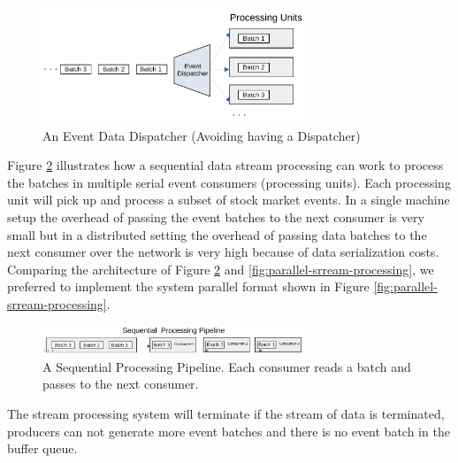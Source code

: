 \begin{figure}[]
    \begin{center}
        \includegraphics[width=0.7\textwidth]{./images/Stream-Batch-Distributions}
        \caption{An Event Data Dispatcher (Avoiding having a Dispatcher)}
        \label{fig:batch-distributions}
    \end{center}
\end{figure}

Figure \ref{fig:Sequential-batch-distributions} illustrates how a sequential data stream processing can work to process the batches in multiple 
serial event consumers (processing units). Each processing unit will pick up and process a subset of stock market events. 
In a single machine setup the overhead of passing the event batches to the next consumer is very small but in a distributed setting the 
overhead of passing data batches to the next consumer over the network is very high because of data serialization costs. Comparing the 
architecture of Figure \ref{fig:Sequential-batch-distributions} and \ref{fig:parallel-srream-processing}, we preferred to implement the system 
parallel format shown in Figure \ref{fig:parallel-srream-processing}. 

\begin{figure}[]
    \begin{center}
        \includegraphics[width=0.7\textwidth]{./images/Stream-Batch-Distributions_op2}
        \caption{A Sequential Processing Pipeline. Each consumer reads a batch and passes to the next consumer. }
        \label{fig:Sequential-batch-distributions}
    \end{center}
\end{figure}

The stream processing system will terminate if the stream of data is terminated, producers can not generate more event batches 
and there is no event batch in the buffer queue. 


